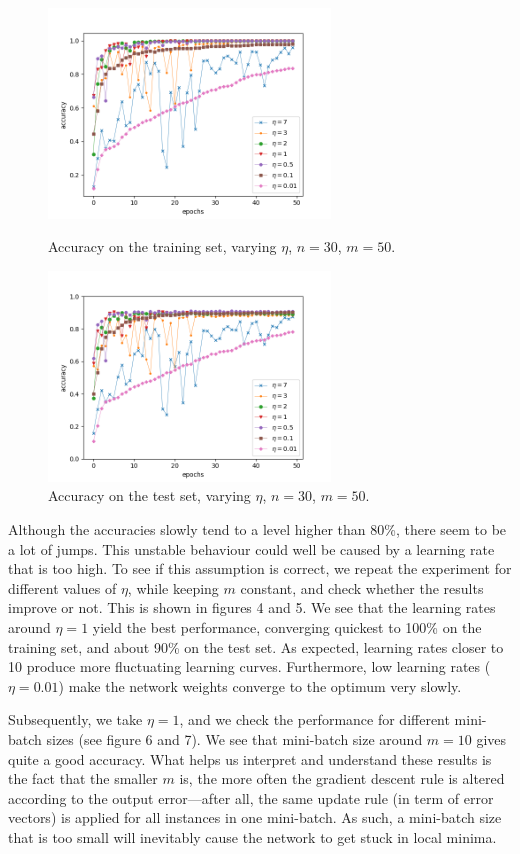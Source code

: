 \documentclass[11pt]{article}
\begin{document}
\begin{figure}[!b]
\centering
\parbox{6cm}{
\includegraphics[width=7.5cm]{delta_eta_train.png}
\caption{Accuracy on the training set, varying $\eta$, $n=30$, $m=50$.}
}
\qquad
\begin{minipage}{6cm}
\includegraphics[width=7.5cm]{delta_eta_test.png}
\caption{Accuracy on the test set, varying $\eta$, $n=30$, $m=50$.}
\end{minipage}
\end{figure}
Although the accuracies slowly tend to a level higher than 80\%, there seem to be a lot of jumps. This unstable behaviour could well be caused by a learning rate that is too high. To see if this assumption is correct, we repeat the experiment for different values of $\eta$, while keeping $m$ constant, and check whether the results improve or not. This is shown in figures 4 and 5. We see that the learning rates around $\eta=1$ yield the best performance, converging quickest to 100\% on the training set, and about 90\% on the test set. As expected, learning rates closer to 10 produce more fluctuating learning curves. Furthermore, low learning rates ($\eta=0.01$) make the network weights converge to the optimum very slowly.\par
Subsequently, we take $\eta=1$, and we check the performance for different mini-batch sizes (see figure 6 and 7). We see that mini-batch size around $m=10$ gives quite a good accuracy. What helps us interpret and understand these results is the fact that the smaller $m$ is, the more often the gradient descent rule is altered according to the output error---after all, the same update rule (in term of error vectors) is applied for all instances in one mini-batch. As such, a mini-batch size that is too small will inevitably cause the network to get stuck in local minima.\par
\end{document}
